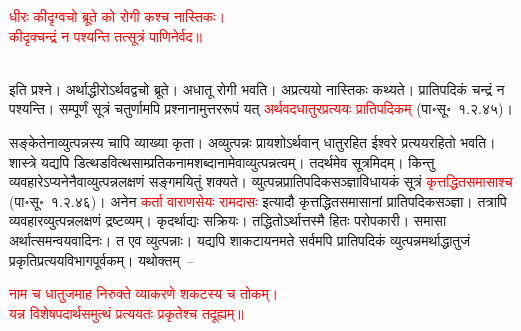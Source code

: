 \centering\textcolor{red}{धीरः कीदृग्वचो ब्रूते को रोगी कश्च नास्तिकः। \nopagebreak\\
कीदृक्चन्द्रं न पश्यन्ति तत्सूत्रं पाणिनेर्वद॥}\nopagebreak\\
\\
\begin{sloppypar}\justifying\noindent इति प्रश्ने। अर्थाद्धीरोऽर्थवद्वचो ब्रूते। अधातू रोगी भवति। अप्रत्ययो नास्तिकः कथ्यते। प्रातिपदिकं चन्द्रं न पश्यन्ति। सम्पूर्णं सूत्रं चतुर्णामपि प्रश्नानामुत्तर\-रूपं यत् \textcolor{red}{अर्थवदधातुरप्रत्ययः प्रातिपदिकम्} (पा॰सू॰~१.२.४५)। \end{sloppypar}
\begin{sloppypar}\justifying\noindent\hspace{10mm} सङ्केतेनाव्युत्पन्नस्य चापि व्याख्या कृता। अव्युत्पन्नः प्रायशोऽर्थवान् धातु\-रहित ईश्वरे प्रत्यय\-रहितो भवति। शास्त्रे यद्यपि डित्थ\-डवित्थ\-साम्प्रतिक\-नाम\-शब्दानामेवाव्युत्पन्नत्वम्। तदर्थमेव सूत्रमिदम्। किन्तु व्यवहारेऽप्यनेनैवाव्युत्पन्न\-लक्षणं सङ्गमयितुं शक्यते। व्युत्पन्न\-प्रातिपदिक\-सञ्ज्ञा\-विधायकं सूत्रं \textcolor{red}{कृत्तद्धितसमासाश्च} (पा॰सू॰~१.२.४६)। अनेन \textcolor{red}{कर्ता वाराणसेयः रामदासः} इत्यादौ कृत्तद्धित\-समासानां प्रातिपदिक\-सञ्ज्ञा। तत्रापि व्यवहार\-व्युत्पन्न\-लक्षणं द्रष्टव्यम्। कृदर्थाद्यः सक्रियः। तद्धितोऽर्थात्तस्मै हितः परोपकारी। समासा अर्थात्समन्वय\-वादिनः। त एव व्युत्पन्नाः। यद्यपि शाकटायन\-मते सर्वमपि प्रातिपदिकं व्युत्पन्नमर्थाद्धातुजं प्रकृति\-प्रत्यय\-विभाग\-पूर्वकम्। यथोक्तम्~–\end{sloppypar}
\centering\textcolor{red}{नाम च धातुजमाह निरुक्ते व्याकरणे शकटस्य च तोकम्।\nopagebreak\\
यन्न विशेषपदार्थसमुत्थं प्रत्ययतः प्रकृतेश्च तदूह्यम्॥}\nopagebreak\\
\\
